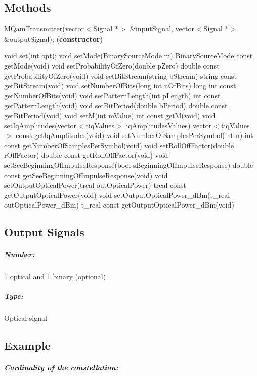 \pagebreak

\subsection*{Methods}

MQamTransmitter(vector$<$Signal *$>$ \&inputSignal, vector$<$Signal *$>$ \&outputSignal); (\textbf{constructor})
\bigbreak

void set(int opt);
\bigbreak
void setMode(BinarySourceMode m)
\bigbreak
BinarySourceMode const getMode(void)
\bigbreak
void setProbabilityOfZero(double pZero)
\bigbreak
double const getProbabilityOfZero(void)
\bigbreak
void setBitStream(string bStream)
\bigbreak
string const getBitStream(void)
\bigbreak
void setNumberOfBits(long int nOfBits)
\bigbreak
long int const getNumberOfBits(void)
\bigbreak
void setPatternLength(int pLength)
\bigbreak
int const getPatternLength(void)
\bigbreak
void setBitPeriod(double bPeriod)
\bigbreak
double const getBitPeriod(void)
\bigbreak
void setM(int mValue)
int const getM(void)
\bigbreak
void setIqAmplitudes(vector$<$t\textunderscore iqValues$>$ iqAmplitudesValues)
\bigbreak
vector$<$t\textunderscore iqValues$>$ const getIqAmplitudes(void)
\bigbreak
void setNumberOfSamplesPerSymbol(int n)
\bigbreak
int const getNumberOfSamplesPerSymbol(void)
\bigbreak
void setRollOffFactor(double rOffFactor)
\bigbreak
double const getRollOffFactor(void)
\bigbreak
void setSeeBeginningOfImpulseResponse(bool sBeginningOfImpulseResponse)
\bigbreak
double const getSeeBeginningOfImpulseResponse(void)
\bigbreak
void setOutputOpticalPower(t\textunderscore real outOpticalPower)
\bigbreak
t\textunderscore real const getOutputOpticalPower(void)
\bigbreak
void setOutputOpticalPower\_dBm(t\_real outOpticalPower\_dBm)
\bigbreak
t\_real const getOutputOpticalPower\_dBm(void)
\pagebreak

\subsection*{Output Signals}

\subparagraph*{Number:} 1 optical and 1 binary (optional)

\subparagraph*{Type:} Optical signal

\subsection*{Example}

\subparagraph*{Cardinality of the constellation:}

